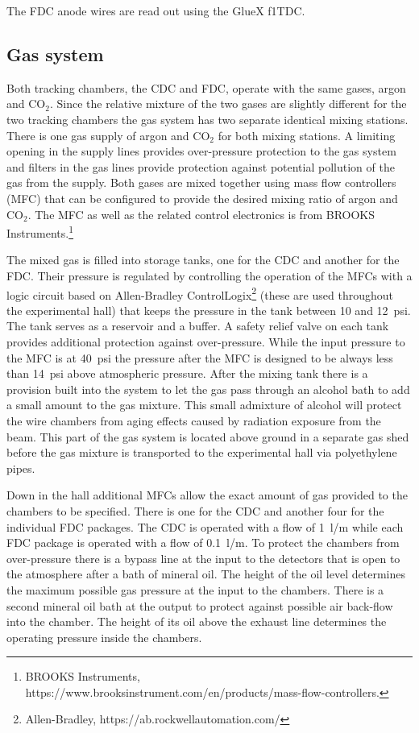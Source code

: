 The FDC anode wires are read out using the GlueX f1TDC\cite{JLAB2002}. 

\subsection[Gas system (Beni)]{Gas system \label{sec:gas}}
Both tracking chambers, the CDC and FDC, operate with the same gases, argon and CO$_{2}$. Since the relative mixture of
the two gases are slightly different for the two tracking chambers the gas system has two separate identical mixing stations. There is one gas supply of argon and CO$_{2}$ for both mixing stations. A limiting opening in the supply
lines provides over-pressure protection to the gas system and filters in the gas lines provide protection against potential
pollution of the gas from the supply. Both gases are mixed together using mass flow controllers (MFC) that can be 
configured
to provide the desired mixing ratio of argon and CO$_{2}$.  The MFC as well as the related control electronics is from
BROOKS Instruments.\footnote{BROOKS Instruments, https://www.brooksinstrument.com/en/products/mass-flow-controllers.}

The mixed gas is filled into storage tanks, one for the CDC and another for the FDC. Their pressure is
regulated by controlling the operation of the MFCs with a logic circuit based on Allen-Bradley ControlLogix\footnote{Allen-Bradley, https://ab.rockwellautomation.com/}
 (these are used throughout the experimental hall) that keeps
the pressure in the tank between 10 and 12~psi. The tank serves as a reservoir and a buffer.
A safety relief valve on each tank
provides additional protection against over-pressure. While the input pressure to the MFC is at 40~psi the pressure after
the MFC is designed to be always less than 14~psi above atmospheric pressure. After the mixing tank there is a provision
built into the system to let the gas pass through an alcohol bath to add a small amount to the gas mixture.
This small admixture of alcohol will protect the wire chambers from aging effects caused by radiation exposure from the beam.
This part of the gas system is located above ground in a separate gas shed before the gas mixture is transported
to the experimental hall via polyethylene pipes.

Down in the hall additional MFCs allow the exact amount of gas provided to the chambers to be specified. There is one for the CDC and another 
four for the individual FDC packages. The CDC is operated with a flow of 1~l/m while each FDC package is operated with
a flow of 0.1~l/m. To protect the chambers from over-pressure there is a bypass line at the input to the detectors that
is open to the atmosphere after a bath of mineral oil. The height of the oil level determines the maximum possible gas pressure at
the input to the chambers. There is a second mineral oil bath at the output to protect against possible air back-flow into
the chamber. The height of its oil above the exhaust line determines the operating pressure inside the chambers.

